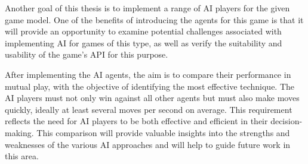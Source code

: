 Another goal of this thesis is to implement a range of AI players for the given game model. One of the benefits of introducing the agents for this game is that it will provide an opportunity to examine potential challenges associated with implementing AI for games of this type, as well as verify the suitability and usability of the game's API for this purpose.

After implementing the AI agents, the aim is to compare their performance in mutual play, with the objective of identifying the most effective technique. The AI players must not only win against all other agents but must also make moves quickly, ideally at least several moves per second on average. This requirement reflects the need for AI players to be both effective and efficient in their decision-making. This comparison will provide valuable insights into the strengths and weaknesses of the various AI approaches and will help to guide future work in this area. 
